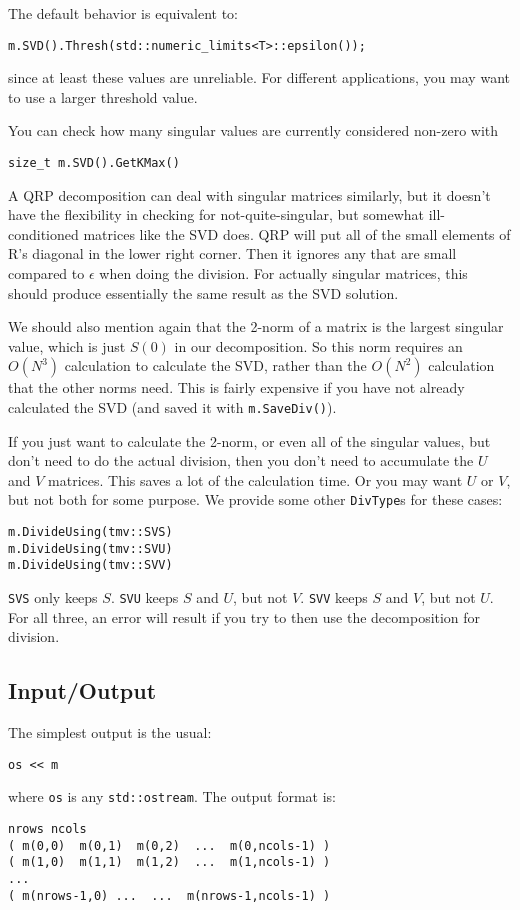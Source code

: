 \documentclass[twoside,letterpaper,11pt]{article}
\renewcommand{\tt}[1]{{\texttt {#1}}}
\begin{document}
The default behavior is equivalent to:
\begin{verbatim}
m.SVD().Thresh(std::numeric_limits<T>::epsilon());
\end{verbatim}
since at least these values are unreliable.  For different applications,
you may want to use a larger threshold value.

You can check how many singular values are currently considered non-zero with
\begin{verbatim}
size_t m.SVD().GetKMax()
\end{verbatim}

A QRP decomposition can deal with singular matrices similarly,
but it doesn't have the flexibility in checking for not-quite-singular,
but somewhat ill-conditioned matrices like the SVD does.
QRP will put all of the small elements of R's diagonal in the 
lower right corner.  Then it ignores any that are small compared to 
$\epsilon$ when doing the division.  For actually singular matrices,
this should produce essentially the same result as the SVD solution.

We should also mention again that the 2-norm of a matrix is the 
largest singular value, which is just $S(0)$ in our decomposition.
So this norm requires an $O(N^3)$ calculation to calculate the 
SVD, rather than the $O(N^2)$ calculation that the other norms need.
This is fairly expensive if you have not already calculated the SVD
(and saved it with \tt{m.SaveDiv()}).

If you just want to calculate the 2-norm, or even all of the singular values,
but don't need to do the actual division, then you don't need to 
accumulate the $U$ and $V$ matrices.  This saves a lot of the 
calculation time.  Or you may want $U$ or $V$, but not both for 
some purpose.  We provide some other \tt{DivType}s for these cases:
\begin{verbatim}
m.DivideUsing(tmv::SVS)
m.DivideUsing(tmv::SVU)
m.DivideUsing(tmv::SVV)
\end{verbatim}
\tt{SVS} only keeps $S$.  
\tt{SVU} keeps $S$ and $U$, but not $V$.
\tt{SVV} keeps $S$ and $V$, but not $U$.
For all three, an error will result if you try to then use the decomposition 
for division.

\subsection{Input/Output}

The simplest output is the usual:
\begin{verbatim}
os << m
\end{verbatim}
where \tt{os} is any \tt{std::ostream}.
The output format is:
\begin{verbatim}
nrows ncols
( m(0,0)  m(0,1)  m(0,2)  ...  m(0,ncols-1) )
( m(1,0)  m(1,1)  m(1,2)  ...  m(1,ncols-1) )
...
( m(nrows-1,0) ...  ...  m(nrows-1,ncols-1) )
\end{verbatim}
\end{document}
